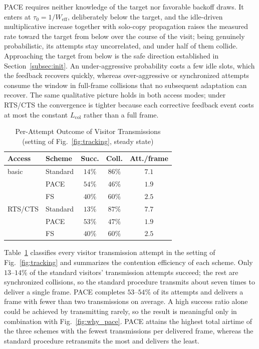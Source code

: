 \documentclass[a4paper,fleqn]{cas-dc}
\begin{document}
PACE requires neither knowledge of the target nor favorable backoff
draws. It enters at
$\tau_0=1/W_\mathrm{eff}$, deliberately below the target, and the
idle-driven multiplicative increase together with solo-copy propagation
raises the measured rate toward the target from below over the
course of the visit; being genuinely probabilistic, its attempts
stay uncorrelated, and under half of them collide. Approaching the
target from below is the safe direction established in
Section~\ref{subsec:init}. An under-aggressive probability costs a few
idle slots, which the feedback recovers quickly, whereas over-aggressive
or synchronized attempts consume the window in full-frame collisions
that no subsequent adaptation can recover. The same qualitative picture holds
in both access modes; under RTS/CTS the convergence is tighter because
each corrective feedback event costs at most the constant
$L_\mathrm{col}$ rather than a full frame.

\begin{table}
\centering
\caption{Per-Attempt Outcome of Visitor Transmissions\\(setting of Fig.~\ref{fig:tracking}, steady state)}
\label{tab:attempts}
\begin{tabular}{llccc}
\hline
\textbf{Access} & \textbf{Scheme} & \textbf{Succ.} & \textbf{Coll.} & \textbf{Att./frame} \\
\hline
basic   & Standard & $14\%$ & $86\%$ & $7.1$ \\
        & PACE          & $54\%$ & $46\%$ & $1.9$ \\
        & FS            & $40\%$ & $60\%$ & $2.5$ \\
\hline
RTS/CTS & Standard & $13\%$ & $87\%$ & $7.7$ \\
        & PACE          & $53\%$ & $47\%$ & $1.9$ \\
        & FS            & $40\%$ & $60\%$ & $2.5$ \\
\hline
\end{tabular}
\end{table}

Table~\ref{tab:attempts} classifies every visitor transmission attempt
in the setting of Fig.~\ref{fig:tracking} and summarizes the
contention efficiency of each scheme. Only $13$--$14\%$ of the
standard visitors' transmission attempts succeed; the rest are
synchronized collisions, so the standard procedure transmits about
seven times to deliver a single frame. PACE completes $53$--$54\%$ of
its attempts and delivers a frame with fewer than two transmissions on
average. A high success ratio alone could be achieved by transmitting
rarely, so the result is meaningful only in combination with
Fig.~\ref{fig:why_pace}. PACE attains the highest total airtime of the
three schemes with the fewest transmissions per delivered frame,
whereas the standard procedure retransmits the most and delivers the
least.
\end{document}
